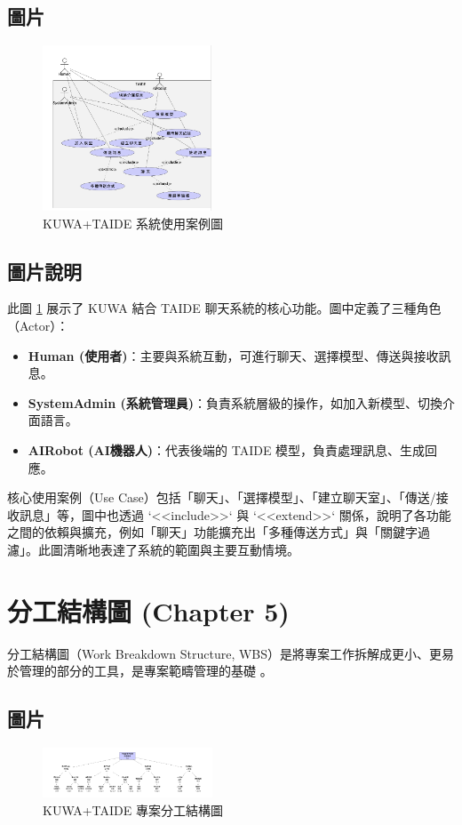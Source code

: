 \documentclass[twocolumn,11pt,a4paper]{article}
\begin{document}
\subsection{圖片}
\begin{figure}[htbp]
    \centering
    \includegraphics[width=0.45\textwidth]{res/image/usge_casee.png}
    \caption{KUWA+TAIDE 系統使用案例圖}
    \label{fig:use_case}
\end{figure}
\FloatBarrier

\subsection{圖片說明}
此圖 \ref{fig:use_case} 展示了 KUWA 結合 TAIDE 聊天系統的核心功能。圖中定義了三種角色（Actor）：
\begin{itemize}
    \item \textbf{Human (使用者)}：主要與系統互動，可進行聊天、選擇模型、傳送與接收訊息。
    \item \textbf{SystemAdmin (系統管理員)}：負責系統層級的操作，如加入新模型、切換介面語言。
    \item \textbf{AIRobot (AI機器人)}：代表後端的 TAIDE 模型，負責處理訊息、生成回應。
\end{itemize}
核心使用案例（Use Case）包括「聊天」、「選擇模型」、「建立聊天室」、「傳送/接收訊息」等，圖中也透過 `<<include>>` 與 `<<extend>>` 關係，說明了各功能之間的依賴與擴充，例如「聊天」功能擴充出「多種傳送方式」與「關鍵字過濾」。此圖清晰地表達了系統的範圍與主要互動情境。

\section{分工結構圖 (Chapter 5)}
分工結構圖（Work Breakdown Structure, WBS）是將專案工作拆解成更小、更易於管理的部分的工具，是專案範疇管理的基礎 \cite{lee2024se}。

\subsection{圖片}
\begin{figure}[htbp]
    \centering
    \includegraphics[width=0.45\textwidth]{res/image/wbs.png}
    \caption{KUWA+TAIDE 專案分工結構圖}
    \label{fig:wbs}
\end{figure}
\FloatBarrier
\end{document}
